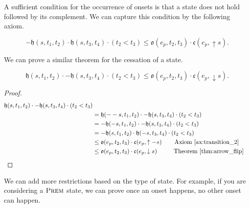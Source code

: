 A sufficient condition for the occurrence of onsets is that a state does not hold followed by its complement. We can capture this condition by the following axiom.

\begin{axiom}\label{ax:transition_2}
    \begin{equation}
        - \mathfrak{h}(s, t_1, t_2) \cdot \mathfrak{h}(s, t_3, t_4) \cdot (t_2 < t_3)\leq \mathfrak{o}(e_p, t_2, t_3) \cdot \mathfrak{c}(e_p, \uparrow s).
    \end{equation}
\end{axiom}

We can prove a similar theorem for the cessation of a state.

\begin{theorem}\label{thm:cessation_3}
    \begin{equation}
        \mathfrak{h}(s, t_1, t_2) \cdot - \mathfrak{h}(s, t_3, t_4) \cdot (t_2 < t_3)\leq \mathfrak{o}(e_p, t_2, t_3) \cdot \mathfrak{c}(e_p, \downarrow s).
    \end{equation}
    
\end{theorem}

\begin{proof} 
    \begin{align*}
        \mathfrak{h}(s, t_1, t_2) \cdot - \mathfrak{h}(s, t_3, t_4) \cdot (t_2 < t_3) \\
        &= \mathfrak{h}(-- s, t_1, t_2) \cdot - \mathfrak{h}(s, t_3, t_4) \cdot (t_2 < t_3) \\
        &= - \mathfrak{h}(- s, t_1, t_2) \cdot - \mathfrak{h}(s, t_3, t_4) \cdot (t_2 < t_3) \\
        &= - \mathfrak{h}(s, t_1, t_2)   \cdot \mathfrak{h}(-s, t_3, t_4) \cdot (t_2 < t_3) \\
        & \leq \mathfrak{o}(e_p, t_2, t_3) \cdot \mathfrak{c}(e_p, \uparrow - s) \hspace{0.06 \linewidth} \text{Axiom~\ref{ax:transition_2}} \\
        &\leq \mathfrak{o}(e_p, t_2, t_3) \cdot \mathfrak{c}(e_p, \downarrow s) \hspace{0.06 \linewidth}  \ \ \text{Theorem~\ref{thm:arrow_flip}}
    \end{align*}
\end{proof}

We can add more restrictions based on the type of state. For example, if you are considering
a $\textsc{Prem}$ state, we can prove once an onset happens, no other onset can happen.


